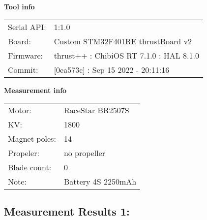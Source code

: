\documentclass[10pt]{article}
\begin{document}
\noindent
{\large \bf Tool info}
\vspace{3mm}

\noindent
\begin{tabular}{ll}
Serial API:  & 1:1.0\\ 
Board:       & Custom STM32F401RE thrustBoard v2\\ 
Firmware:    & thrust++ : ChibiOS RT 7.1.0 : HAL 8.1.0\\ 
Commit:      & [0ea573c] : Sep 15 2022 - 20:11:16
\end{tabular}
\vspace{3mm}

\noindent
{\large \bf Measurement info}
\vspace{3mm}

\noindent
\begin{tabular}{ll}
Motor:        & RaceStar BR2507S\\ 
KV:           & 1800\\ 
Magnet poles: & 14\\ 
Propeler:     & no propeller\\ 
Blade count:  & 0\\ 
Note:         & Battery 4S 2250mAh
\end{tabular}

\vspace{3mm}


\subsection*{\large \bf Measurement Results 1:}
\end{document}

